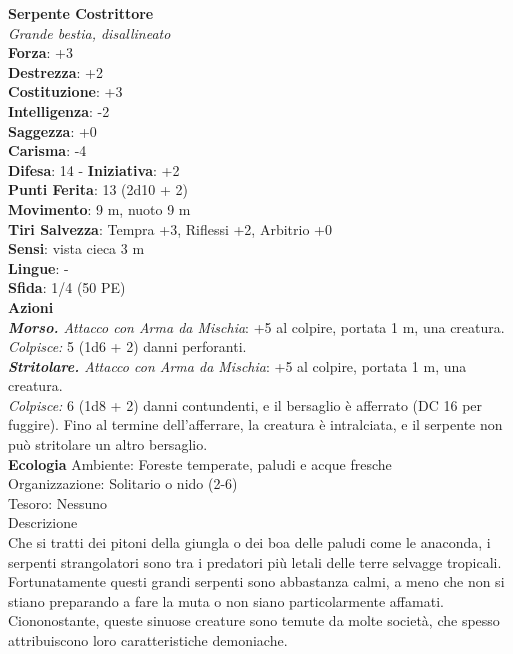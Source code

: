 \begin{multicols}{2}
\medskip\textbf{Serpente Costrittore}\\
\emph{Grande bestia, disallineato}\\
\textbf{Forza}: +3\\
\textbf{Destrezza}: +2\\
\textbf{Costituzione}: +3\\
\textbf{Intelligenza}: -2\\
\textbf{Saggezza}: +0\\
\textbf{Carisma}: -4\\
\textbf{Difesa}: 14 - \textbf{Iniziativa}: +2\\
\textbf{Punti Ferita}: 13 (2d10 + 2)\\
\textbf{Movimento}: 9 m, nuoto 9 m\\
\textbf{Tiri Salvezza}: Tempra +3, Riflessi +2, Arbitrio +0\\
\textbf{Sensi}: vista cieca 3 m\\
\textbf{Lingue}: -\\
\textbf{Sfida}: 1/4 (50 PE)\smallskip\\
\smallskip\textbf{Azioni}\\
\emph{\textbf{Morso.} Attacco con Arma da Mischia}: +5 al colpire, portata 1 m, una creatura.\\
\emph{Colpisce:} 5 (1d6 + 2) danni perforanti.\\
\emph{\textbf{Stritolare.} Attacco con Arma da Mischia}: +5 al colpire, portata 1 m, una creatura.\\
\emph{Colpisce:} 6 (1d8 + 2) danni contundenti, e il bersaglio è afferrato (DC  16 per fuggire). Fino al termine dell'afferrare, la creatura è intralciata, e il serpente non può stritolare un altro bersaglio.\\
\textbf{Ecologia}
Ambiente: Foreste temperate, paludi e acque fresche\\
Organizzazione: Solitario o nido (2-6)\\
Tesoro: Nessuno\\
Descrizione\\
Che si tratti dei pitoni della giungla o dei boa delle paludi come le anaconda, i serpenti strangolatori sono tra i predatori più letali delle terre selvagge tropicali. Fortunatamente questi grandi serpenti sono abbastanza calmi, a meno che non si stiano preparando a fare la muta o non siano particolarmente affamati. Ciononostante, queste sinuose creature sono temute da molte società, che spesso attribuiscono loro caratteristiche demoniache.\\


\end{multicols}
